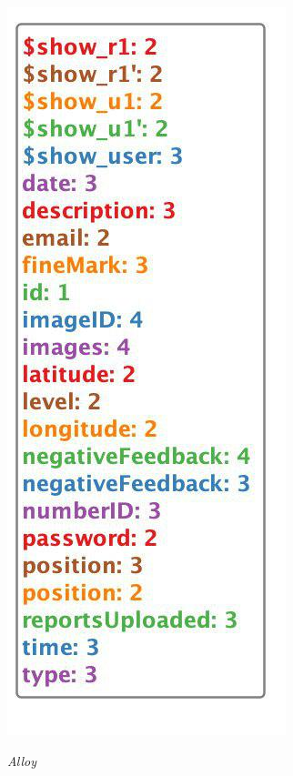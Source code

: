 \documentclass[../RASD.tex]{subfiles}
\begin{document}
    \begin{figure}[H]
        \centering
        \includegraphics[scale = 0.8]{assets/predShow.png}\\[1.6 cm]
        \caption[ \textit{Alloy}]{ \textit{Alloy}}
    \end{figure}
\end{document}
